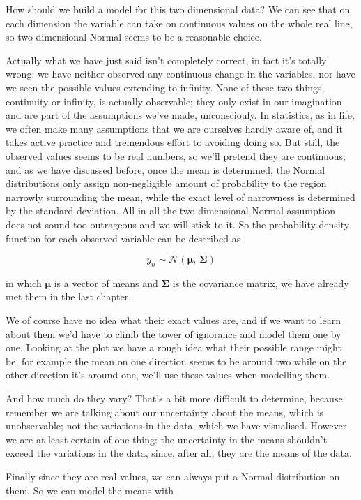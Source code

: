 \documentclass[11pt]{article}
\begin{document}
How should we build a model for this two dimensional data? We can see that on each dimension the variable can take on continuous values on the whole real line, so two dimensional Normal seems to be a reasonable choice.

Actually what we have just said isn't completely correct, in fact it's totally wrong: we have neither observed any continuous change in the variables, nor have we seen the possible values extending to infinity. None of these two things, continuity or infinity, is actually observable; they only exist in our imagination and are part of the assumptions we've made, unconsciouly. In statistics, as in life, we often make many assumptions that we are ourselves hardly aware of, and it takes active practice and tremendous effort to avoiding doing so. But still, the observed values seems to be real numbers, so we'll pretend they are continuous; and as we have discussed before, once the mean is determined, the Normal distributions only assign non-negligible amount of probability to the region narrowly surrounding the mean, while the exact level of narrowness is determined by the standard deviation. All in all the two dimensional Normal assumption does not sound too outrageous and we will stick to it. So the probability density function for each observed variable can be described as

$$y_n \sim \mathcal{N}(\boldsymbol\mu,\, \boldsymbol\Sigma)$$

in which \(\boldsymbol\mu\) is a vector of means and \(\boldsymbol\Sigma\) is the covariance matrix, we have already met them in the last chapter.

We of course have no idea what their exact values are, and if we want to learn about them we'd have to climb the tower of ignorance and model them one by one. Looking at the plot we have a rough idea what their possible range might be, for example the mean on one direction seems to be around two while on the other direction it's around one, we'll use these values when modelling them.

And how much do they vary? That's a bit more difficult to determine, because remember we are talking about our uncertainty about the means, which is unobservable; not the variations in the data, which we have visualised. However we are at least certain of one thing: the uncertainty in the means shouldn't exceed the variations in the data, since, after all, they are the means of the data.

Finally since they are real values, we can always put a Normal distribution on them. So we can model the means with
\end{document}
